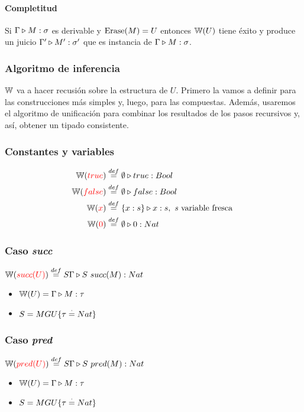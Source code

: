 \paragraph{Completitud} Si $\Gamma\triangleright M : \sigma$ es derivable y $\operatorname{Erase}(M) = U$ entonces $\mathbb{W}(U)$ tiene éxito y produce un juicio $\Gamma'\triangleright M' : \sigma'$ que es instancia de $\Gamma\triangleright M : \sigma$. 

\subsubsection{Algoritmo de inferencia}
$\mathbb{W}$ va a hacer recusión sobre la estructura de $U$. Primero la vamos a definir para las construcciones más simples y, luego, para las compuestas. Además, usaremos el algoritmo de unificación para combinar los resultados de los pasos recursivos y, así, obtener un tipado consistente.

\subsubsection{Constantes y variables}
\begin{equation*}
	\begin{split}
		\mathbb{W}({\color{red}true}) &\overset{def}{=} \emptyset\triangleright true : Bool \\
		\mathbb{W}({\color{red}false}) &\overset{def}{=} \emptyset\triangleright false : Bool \\
		\mathbb{W}({\color{red}x}) &\overset{def}{=} \{x:s\}\triangleright x : s, \text{ \textit{s} variable fresca } \\
		\mathbb{W}({\color{red}0}) &\overset{def}{=} \emptyset\triangleright 0 : Nat \\
	\end{split}
\end{equation*}

\subsubsection{Caso \textit{succ}}
$\mathbb{W}({\color{red}succ(U)}) \overset{def}{=} S\Gamma\triangleright S~succ(M) : Nat$
\begin{centrado}
	\begin{itemize}
		\item $\mathbb{W}(U) = \Gamma\triangleright M : \tau$
		\item $S = MGU\{\tau\overset{\cdot}{=} Nat\}$
	\end{itemize}
\end{centrado}

\subsubsection{Caso \textit{pred}}
$\mathbb{W}({\color{red}pred(U)}) \overset{def}{=} S\Gamma\triangleright S~pred(M) : Nat$
\begin{centrado}
	\begin{itemize}
		\item $\mathbb{W}(U) = \Gamma\triangleright M : \tau$
		\item $S = MGU\{\tau\overset{\cdot}{=} Nat\}$
	\end{itemize}
\end{centrado}

